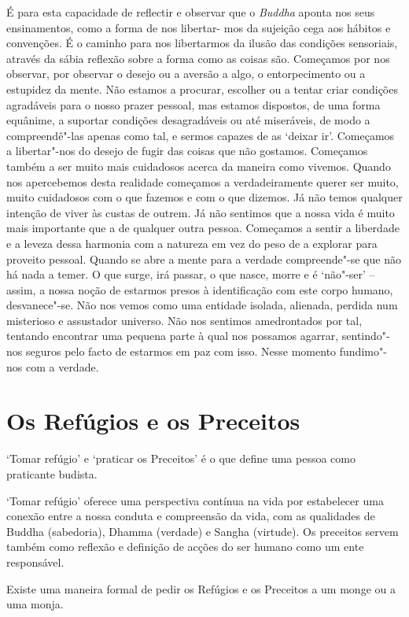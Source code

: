 É para esta capacidade de reflectir e observar que o \emph{Buddha}
aponta nos seus ensinamentos, como a forma de nos libertar- mos da
sujeição cega aos hábitos e convenções. É o caminho para nos libertarmos
da ilusão das condições sensoriais, através da sábia reflexão sobre a forma
como as coisas são. Começamos por nos observar, por observar o desejo ou
a aversão a algo, o entorpecimento ou a estupidez da mente. Não
estamos a procurar, escolher ou a tentar criar condições agradáveis para
o nosso prazer pessoal, mas estamos dispostos, de uma forma equânime,
a suportar condições desagradáveis ou até miseráveis, de modo a
compreendê"-las apenas como tal, e sermos capazes de as `deixar ir'.
Começamos a libertar"-nos do desejo de fugir das coisas que não gostamos.
Começamos também a ser muito mais cuidadosos acerca da maneira como
vivemos. Quando nos apercebemos desta realidade começamos a
verdadeiramente querer ser muito, muito cuidadosos com o que fazemos e
com o que dizemos. Já não temos qualquer intenção de viver às custas de
outrem. Já não sentimos que a nossa vida é muito mais importante que a
de qualquer outra pessoa. Começamos a sentir a liberdade e a leveza
dessa harmonia com a natureza em vez do peso de a explorar para proveito
pessoal. Quando se abre a mente para a verdade compreende"-se que não há
nada a temer. O que surge, irá passar, o que nasce, morre e é `não"-ser'
-- assim, a nossa noção de estarmos presos à identificação com este
corpo humano, desvanece"-se. Não nos vemos como uma entidade isolada,
alienada, perdida num misterioso e assustador universo. Não nos sentimos
amedrontados por tal, tentando encontrar uma pequena parte à qual nos
possamos agarrar, sentindo"-nos seguros pelo facto de estarmos em paz com
isso. Nesse momento fundimo"-nos com a verdade.

\chapter{Os Refúgios e os Preceitos}

`Tomar refúgio' e `praticar os Preceitos' é o que define uma
pessoa como praticante budista.

`Tomar refúgio' oferece uma perspectiva contínua na vida por estabelecer
uma conexão entre a nossa conduta e compreensão da vida, com as
qualidades de Buddha (sabedoria), Dhamma (verdade) e Sangha (virtude).
Os preceitos servem também como reflexão e definição de acções do ser
humano como um ente responsável.

Existe uma maneira formal de pedir os Refúgios e os Preceitos a um monge
ou a uma monja.

